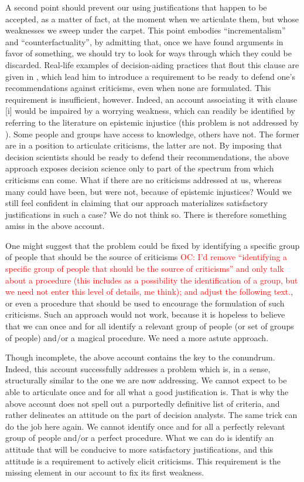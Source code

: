 \documentclass[preprint, french, english, 11pt, authoryear]{elsarticle}%
\newcommand{\commentOC}[1]{\textcolor{red}{OC: #1}}
\begin{document}
A second point should prevent our using justifications that happen to be accepted, as a matter of fact, at the moment when we articulate them, but whose weaknesses we sweep under the carpet. This point embodies “incrementalism” and ``counterfactuality'', by admitting that, once we have found arguments in favor of something, we should try to look for ways through which they could be discarded. Real-life examples of decision-aiding practices that flout this clause are given in \cite{meinard_what_2017}, which lead him to introduce a requirement to be ready to defend one's recommendations against criticisms, even when none are formulated. This requirement is insufficient, however. Indeed, an account associating it with clause [i] would be impaired by a worrying weakness, which can readily be identified by referring to the literature on epistemic injustice \cite{fricker_epistemic_2007} (this problem is not addressed by \cite{meinard_what_2017}). Some people and groups have access to knowledge, others have not. The former are in a position to articulate criticisms, the latter are not. By imposing that decision scientists should be ready to defend their recommendations, the above approach exposes decision science only to part of the spectrum from which criticisms can come. What if there are no criticisms addressed at us, whereas many could have been, but were not, because of epistemic injustices? Would we still feel confident in claiming that our approach materializes satisfactory justifications in such a case? We do not think so. There is therefore something amiss in the above account.

One might suggest that the problem could be fixed by identifying a specific group of people that should be the source of criticisms \commentOC{I’d remove “identifying a specific group of people that should be the source of criticisms” and only talk about a procedure (this includes as a possibility the identification of a group, but we need not enter this level of details, me think); and adjust the following text.}, or even a procedure that should be used to encourage the formulation of such criticisms. Such an approach would not work, because it is hopeless to believe that we can once and for all identify a relevant group of people (or set of groups of people) and/or a magical procedure. We need a more astute approach.

Though incomplete, the above account contains the key to the conundrum. Indeed, this account successfully addresses a problem which is, in a sense, structurally similar to the one we are now addressing. We cannot expect to be able to articulate once and for all what a good justification is. That is why the above account does not spell out a purportedly definitive list of criteria, and rather delineates an attitude on the part of decision analysts. The same trick can do the job here again. We cannot identify once and for all a perfectly relevant group of people and/or a perfect procedure. What we can do is identify an attitude that will be conducive to more satisfactory justifications, and this attitude is a requirement to actively elicit criticisms. This requirement is the missing element in our account to fix its first weakness.
\end{document}
